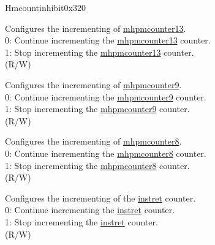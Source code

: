 \begin{register}{H}{mcountinhibit}{0x320}\label{regdesc:MCOUNTINHIBIT}
%
%
%
%
%
%
%
%
%
\regnewline%
\begin{regdesc}\begin{reglist}
\label{fielddesc:MCOUNTERINH_HPM_13}\item [{HPM13}] Configures the incrementing of \hyperref[regdesc:MHPMCOUNTER13] {mhpmcounter13}.\\
0: Continue incrementing the \hyperref[regdesc:MHPMCOUNTER13] {mhpmcounter13} counter.\\
1: Stop incrementing the \hyperref[regdesc:MHPMCOUNTER13] {mhpmcounter13} counter.\\
(R/W)
\label{fielddesc:MCOUNTERINH_HPM_9}\item [{HPM9}] Configures the incrementing of \hyperref[regdesc:MHPMCOUNTER9] {mhpmcounter9}.\\
0: Continue incrementing the \hyperref[regdesc:MHPMCOUNTER9] {mhpmcounter9} counter. \\
1: Stop incrementing the \hyperref[regdesc:MHPMCOUNTER9] {mhpmcounter9} counter. \\
(R/W)
\label{fielddesc:MCOUNTERINH_HPM_8}\item [{HPM8}] Configures the incrementing of \hyperref[regdesc:MHPMCOUNTER8] {mhpmcounter8}.\\
0: Continue incrementing the \hyperref[regdesc:MHPMCOUNTER8] {mhpmcounter8} counter. \\
1: Stop incrementing the \hyperref[regdesc:MHPMCOUNTER8] {mhpmcounter8} counter. \\
(R/W)
\label{fielddesc:MCOUNTINHIBIT_IR}\item [IR] Configures the incrementing of the \hyperref[regdesc:INSTRET]{instret} counter. \\
0: Continue incrementing the \hyperref[regdesc:INSTRET]{instret} counter.\\
1: Stop incrementing the \hyperref[regdesc:INSTRET]{instret} counter. \\
(R/W)


\end{reglist}
\end{regdesc}
\end{register}
